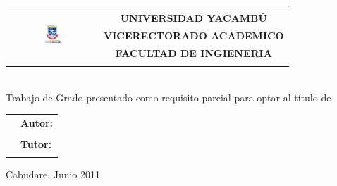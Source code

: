 \setcounter{page}{2}
\begin{tabular*}{0.82\textwidth}{@{\extracolsep{\fill}} cc }
  \multirow{6}{*}{\includegraphics[width=0.20\textwidth]{img/UNY.png}} 
  & 						\\
  & \large{\textbf{UNIVERSIDAD YACAMBÚ}} 	\\
  & \large{\textbf{VICERECTORADO ACADEMICO}} 	\\
  & \large{\textbf{FACULTAD DE INGIENERIA}} 	\\
  & 						\\
\end{tabular*}
\vspace{6cm}
\begin{center}
\Large{\textbf{\Titulo}}\\
\large{Trabajo de Grado presentado como requisito parcial para optar al título de \Grado }\\
\end{center}
\vspace{1.5cm}
\begin{tabular}{l l}
    \hspace{65mm}	&	\textbf{Autor:}	\\
			&	\Autor		\\
			&	\textbf{Tutor:}	\\
			&	\Tutor		\\
\end{tabular}
\vspace{4.5cm}
\begin{center}
Cabudare, Junio 2011\\
\end{center}
